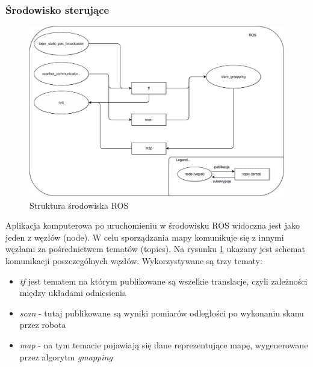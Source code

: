 \subsubsection{Środowisko sterujące}
\label{sec:ros-env}
\begin{figure}[ht]
	\centering
		\includegraphics[width=1\linewidth]{rys/pc-application-infrastructure.pdf}
	\caption{Struktura środowiska ROS}
	\label{fig:pc-app-ros-infrastructure}
\end{figure}

Aplikacja komputerowa po uruchomieniu w środowisku ROS widoczna jest jako jeden z węzłów (node). W celu sporządzania mapy komunikuje się z innymi węzłami za pośrednictwem tematów (topics).
Na rysunku \ref{fig:pc-app-ros-infrastructure} ukazany jest schemat komunikacji poszczególnych węzłów.
Wykorzystywane są trzy tematy:
\begin{itemize}
    \item \emph{tf} jest tematem na którym publikowane są wszelkie translacje, czyli zależności między układami odniesienia
    \item \emph{scan} - tutaj publikowane są wyniki pomiarów odległości po wykonaniu skanu przez robota
    \item \emph{map} - na tym temacie pojawiają się dane reprezentujące mapę, wygenerowane przez algorytm \emph{gmapping}\cite{Grisetti2005}\cite{gmapping-website}\cite{gmapping-ros}
\end{itemize}

